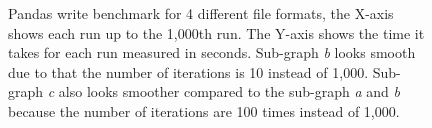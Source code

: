  \begin{figure}[H]%
    \centering
    \quad
    \caption{Pandas write benchmark for 4 different file formats, the X-axis shows each run up to the 1,000th run. The Y-axis shows the time it takes for each run measured in seconds. Sub-graph \textit{b} looks smooth due to that the number of iterations is 10 instead of 1,000. Sub-graph \textit{c} also looks smoother compared to the sub-graph \textit{a} and \textit{b} because the number of iterations are  100 times instead of 1,000.}%
    \label{fig:write_benchmark}%
\end{figure}

